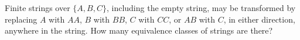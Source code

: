 Finite strings over $\{A,B,C\}$, including the empty string, may be transformed by replacing $A$ with $AA$, $B$ with $BB$, $C$ with $CC$, or $AB$ with $C$, in either direction, anywhere in the string. How many equivalence classes of strings are there?

